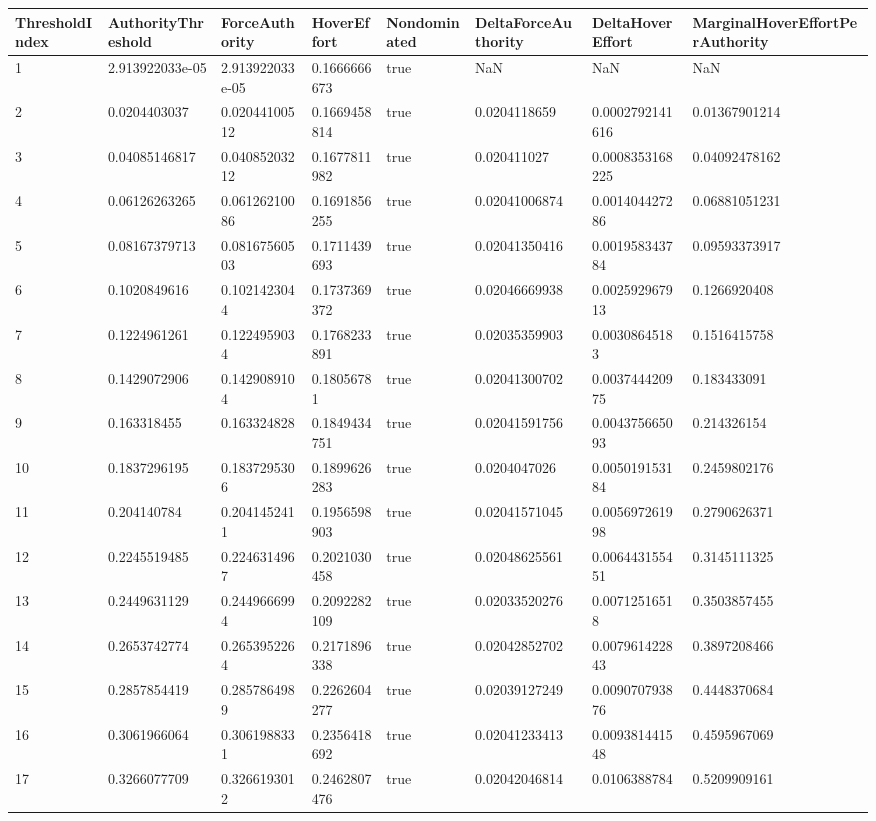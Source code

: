 \begin{tabular}{@{}llllllll@{}}
\toprule
ThresholdIndex & AuthorityThreshold & ForceAuthority & HoverEffort & Nondominated & DeltaForceAuthority & DeltaHoverEffort & MarginalHoverEffortPerAuthority \\
\midrule
1 & 2.913922033e-05 & 2.913922033e-05 & 0.1666666673 & true & NaN & NaN & NaN \\
2 & 0.0204403037 & 0.02044100512 & 0.1669458814 & true & 0.0204118659 & 0.0002792141616 & 0.01367901214 \\
3 & 0.04085146817 & 0.04085203212 & 0.1677811982 & true & 0.020411027 & 0.0008353168225 & 0.04092478162 \\
4 & 0.06126263265 & 0.06126210086 & 0.1691856255 & true & 0.02041006874 & 0.001404427286 & 0.06881051231 \\
5 & 0.08167379713 & 0.08167560503 & 0.1711439693 & true & 0.02041350416 & 0.001958343784 & 0.09593373917 \\
6 & 0.1020849616 & 0.1021423044 & 0.1737369372 & true & 0.02046669938 & 0.002592967913 & 0.1266920408 \\
7 & 0.1224961261 & 0.1224959034 & 0.1768233891 & true & 0.02035359903 & 0.00308645183 & 0.1516415758 \\
8 & 0.1429072906 & 0.1429089104 & 0.18056781 & true & 0.02041300702 & 0.003744420975 & 0.183433091 \\
9 & 0.163318455 & 0.163324828 & 0.1849434751 & true & 0.02041591756 & 0.004375665093 & 0.214326154 \\
10 & 0.1837296195 & 0.1837295306 & 0.1899626283 & true & 0.0204047026 & 0.005019153184 & 0.2459802176 \\
11 & 0.204140784 & 0.2041452411 & 0.1956598903 & true & 0.02041571045 & 0.005697261998 & 0.2790626371 \\
12 & 0.2245519485 & 0.2246314967 & 0.2021030458 & true & 0.02048625561 & 0.006443155451 & 0.3145111325 \\
13 & 0.2449631129 & 0.2449666994 & 0.2092282109 & true & 0.02033520276 & 0.00712516518 & 0.3503857455 \\
14 & 0.2653742774 & 0.2653952264 & 0.2171896338 & true & 0.02042852702 & 0.007961422843 & 0.3897208466 \\
15 & 0.2857854419 & 0.2857864989 & 0.2262604277 & true & 0.02039127249 & 0.009070793876 & 0.4448370684 \\
16 & 0.3061966064 & 0.3061988331 & 0.2356418692 & true & 0.02041233413 & 0.009381441548 & 0.4595967069 \\
17 & 0.3266077709 & 0.3266193012 & 0.2462807476 & true & 0.02042046814 & 0.0106388784 & 0.5209909161 \\

\end{tabular}
